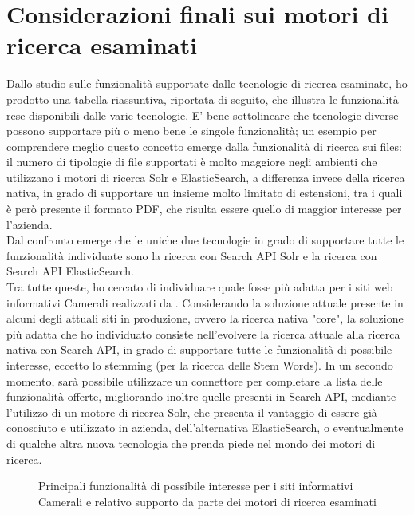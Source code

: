 	\section{Considerazioni finali sui motori di ricerca esaminati}
	Dallo studio sulle funzionalità supportate dalle tecnologie di ricerca esaminate, ho prodotto una tabella riassuntiva, riportata di seguito, che illustra le funzionalità rese disponibili dalle varie tecnologie. E' bene sottolineare che tecnologie diverse possono supportare più o meno bene le singole funzionalità; un esempio per comprendere meglio questo concetto emerge dalla funzionalità di ricerca sui files: il numero di tipologie di file supportati è molto maggiore negli ambienti che utilizzano i motori di ricerca \gls{Solr} e \gls{ElasticSearch}, a differenza invece della ricerca nativa, in grado di supportare un insieme molto limitato di estensioni, tra i quali è però presente il formato PDF, che risulta essere quello di maggior interesse per l'azienda. \\
	Dal confronto emerge che le uniche due tecnologie in grado di supportare tutte le funzionalità individuate sono la ricerca con Search API Solr e la ricerca con Search API ElasticSearch. \\
	Tra tutte queste, ho cercato di individuare quale fosse più adatta per i siti web informativi Camerali realizzati da \nomeAzienda. Considerando la soluzione attuale presente in alcuni degli attuali siti in produzione, ovvero la ricerca nativa "core", la soluzione più adatta che ho individuato consiste nell'evolvere la ricerca attuale alla ricerca nativa con Search API, in grado di supportare tutte le funzionalità di possibile interesse, eccetto lo stemming (per la ricerca delle \gls{Stem Words}). In un secondo momento, sarà possibile utilizzare un connettore per completare la lista delle funzionalità offerte, migliorando inoltre quelle presenti in Search API, mediante l'utilizzo di un motore di ricerca \gls{Solr}, che presenta il vantaggio di essere già conosciuto e utilizzato in azienda, dell'alternativa \gls{ElasticSearch}, o eventualmente di qualche altra nuova tecnologia che prenda piede nel mondo dei motori di ricerca.
	
	\begin{figure}[p]
		\caption{Principali funzionalità di possibile interesse per i siti informativi Camerali e relativo supporto da parte dei motori di ricerca esaminati}
	\end{figure}